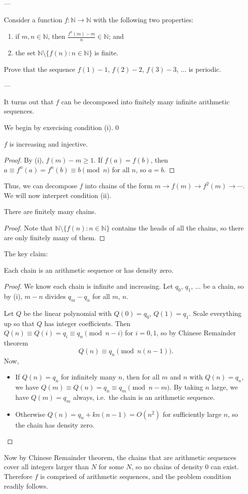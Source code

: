 
---

Consider a function $f:\mathbb N\to\mathbb N$ with the following two properties:
\begin{enumerate}[label=(\roman*),itemsep=0em]
    \item if $m,n\in\mathbb N$, then $\frac{f^n(m)-m}n\in\mathbb N$; and
    \item the set $\mathbb N\setminus\{f(n):n\in\mathbb N\}$ is finite.
\end{enumerate}
Prove that the sequence $f(1)-1$, $f(2)-2$, $f(3)-3$, $\ldots$ is periodic.

---

It turns out that $f$ can be decomposed into finitely many infinite arithmetic sequences.

We begin by exercising condition (i).
\setcounter{claim}0
\begin{claim}
    $f$ is increasing and injective.
\end{claim}
\begin{proof}
    By (i), $f(m)-m\ge1$. If $f(a)=f(b)$, then $a\equiv f^n(a)=f^n(b)\equiv b\pmod n$ for all $n$, so $a=b$.
\end{proof}

Thus, we can decompose $f$ into chains of the form $m\to f(m)\to f^2(m)\to\cdots$. We will now interpret condition (ii).
\begin{claim}
    There are finitely many chains.
\end{claim}
\begin{proof}
    Note that $\mathbb N\setminus\{f(n):n\in\mathbb N\}$ contains the heads of all the chains, so there are only finitely many of them.
\end{proof}

The key claim:
\begin{claim}[USAMO 1995/4]
    Each chain is an arithmetic sequence or has density zero.
\end{claim}
\begin{proof}
    We know each chain is infinite and increasing. Let $q_0$, $q_1$, $\ldots$ be a chain, so by (i), $m-n$ divides $q_m-q_n$ for all $m$, $n$.

    Let $Q$ be the linear polynomial with $Q(0)=q_0$, $Q(1)=q_1$. Scale everything up so that $Q$ has integer coefficients. Then $Q(n)\equiv Q(i)=q_i\equiv q_n\pmod{n-i}$ for $i=0,1$, so by Chinese Remainder theorem
    \[Q(n)\equiv q_n\pmod{n(n-1)}.\]
    Now,
    \begin{itemize}
        \item If $Q(n)=q_n$ for infinitely many $n$, then for all $m$ and $n$ with $Q(n)=q_n$, we have $Q(m)\equiv Q(n)=q_n\equiv q_m\pmod{n-m}$. By taking $n$ large, we have $Q(m)=q_m$ always, i.e.\ the chain is an arithmetic sequence.
        \item Otherwise $Q(n)=q_n+kn(n-1)=O(n^2)$ for sufficiently large $n$, so the chain has density zero.
    \end{itemize}
\end{proof}

Now by Chinese Remainder theorem, the chains that are arithmetic sequences cover all integers larger than $N$ for some $N$, so no chains of density 0 can exist. Therefore $f$ is comprised of arithmetic sequences, and the problem condition readily follows.


